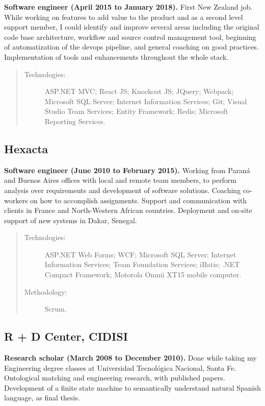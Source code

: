 \textbf{Software engineer (April 2015 to January 2018).} First New Zealand job. While working on features to add value to the product and as a second level support member, I could identify and improve several areas including the original code base architecture, workflow and source control management tool, beginning of automatization of the devops pipeline, and general coaching on good practices. Implementation of tools and enhancements throughout the whole stack.

\begin{quote}
\begin{description}
    \item[Technologies:] ASP.NET MVC; React JS; Knockout JS; JQuery; Webpack; Microsoft SQL Server; Internet Information Services; Git; Visual Studio Team Services; Entity Framework; Redis; Microsoft Reporting Services.
\end{description}
\end{quote}

\subsection*{Hexacta}

\textbf{Software engineer (June 2010 to February 2015).} Working from Paraná and Buenos Aires offices with local and remote team members, to perform analysis over requirements and development of software solutions. Coaching co-workers on how to accomplish assignments. Support and communication with clients in France and North-Western African countries. Deployment and on-site support of new systems in Dakar, Senegal.

\begin{quote}
\begin{description}
    \item[Technologies:] ASP.NET Web Forms; WCF; Microsoft SQL Server; Internet Information Services; Team Foundation Services; iBatis; .NET Compact Framework; Motorola Omnii XT15 mobile computer.
    \item[Methodology:] Scrum.
\end{description}
\end{quote}

\subsection*{R + D Center, CIDISI}

\textbf{Research scholar (March 2008 to December 2010).} Done while taking my Engineering degree classes at Universidad Tecnológica Nacional, Santa Fe. Ontological matching and engineering research, with published papers. Development of a finite state machine to semantically understand natural Spanish language, as final thesis.
